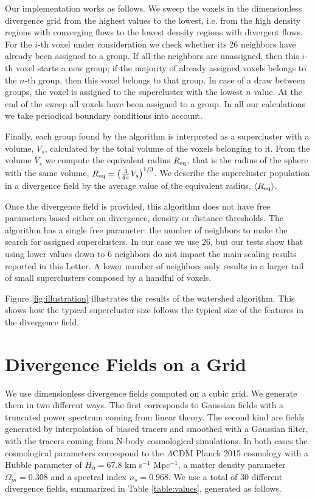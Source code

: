 \documentclass[usenatbib]{mnras}
\begin{document}
Our implementation works as follows. 
We sweep the voxels in the dimensionless divergence grid from the highest values to the lowest, i.e. from the high density regions with converging flows to the lowest density regions with divergent flows.
For the $i$-th voxel under consideration we check whether its 26 neighbors have already been assigned to a group. 
If all the neighbors are unassigned, then this $i$-th voxel starts a new group; if the majority of already assigned voxels belongs to the $n$-th group, then this voxel belongs to that group.
In case of a draw between groups, the voxel is assigned to the supercluster with the lowest $n$ value.
At the end of the sweep all voxels have been assigned to a group. 
In all our calculations we take periodical boundary conditions into account.  

Finally, each group found by the algorithm is interpreted as a supercluster 
with a volume, $V_s$, calculated by the total volume of the voxels belonging to it.
From the volume $V_s$ we compute the equivalent radius $R_{\rm eq}$, that is the radius of the sphere with the same volume, 
   $ R_{\rm eq} = \left(\frac{3}{4\pi}V_{s}\right)^{1/3}$.
We describe the supercluster population in a divergence field by the average value of the equivalent radius, $\langle R_{\rm eq}\rangle$.

Once the divergence field is provided, this algorithm  does not have free parameters based either on divergence, density or distance thresholds. 
The algorithm has a single free parameter: the number of neighbors to make the search for assigned superclusters.
In our case we use $26$, but our tests show that using lower values down to $6$ neighbors do not impact the main scaling results reported in this Letter. 
A lower number of neighbors only results in a larger tail of small superclusters composed by a handful of voxels.

Figure \ref{fig:illustration} illustrates the results of the watershed algorithm. 
This shows how the typical supercluster size follows the typical size of the features in the divergence field.


\section{Divergence Fields on a Grid}
\label{sec:fields}

We use dimensionless divergence fields computed on a cubic grid. 
We generate them in two different ways.
The first corresponds to Gaussian fields with a truncated power spectrum coming from linear theory.
The second kind are fields generated by interpolation of biased tracers and smoothed with a Gaussian filter, with the tracers coming from N-body cosmological simulations.
In both cases the cosmological parameters correspond to the
$\Lambda$CDM Planck 2015 cosmology \citep{2016A&A...594A..13P} with a Hubble parameter of $H_0=67.8$ km s$^{-1}$ Mpc$^{-1}$, a matter density parameter $\Omega_m=0.308$ and a spectral index $n_s=0.968$.
We use a total of $30$ different divergence fields, summarized in Table \ref{table:values}, generated as follows.
\end{document}
